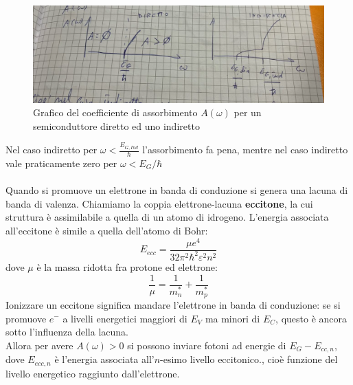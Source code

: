 \documentclass{book}
\begin{document}
        \begin{figure}[h!]
            \centering
            \includegraphics[width=0.75\linewidth]{img/imnothere7.png}
            \caption{Grafico del coefficiente di assorbimento $A(\omega)$ per un semiconduttore diretto ed uno indiretto}
        \end{figure}
        Nel caso indiretto per $\displaystyle \omega  < \frac{E_{G,Ind}}{\hbar}$ l'assorbimento fa pena, mentre nel caso indiretto vale praticamente zero per $\omega < E_{G}/\hbar$
    \paragraph{}
        Quando si promuove un elettrone in banda di conduzione si genera una lacuna di banda di valenza. Chiamiamo la coppia elettrone-lacuna \textbf{eccitone}, la cui struttura è assimilabile a quella di un atomo di idrogeno. L'energia associata all'eccitone è simile a quella dell'atomo di Bohr:
        $$E_{ecc} = \frac{\mu e^{4}}{32 \pi^{2} \hbar^{2} \varepsilon^{2} n^{2}}$$
        dove $\mu$ è la massa ridotta fra protone ed elettrone:
        $$\frac{1}{\mu} = \frac{1}{m_{n} ^{*}}+\frac{1}{m_{p} ^{*}}$$
        Ionizzare un eccitone significa mandare l'elettrone in banda di conduzione: se si promuove $e^{-}$ a livelli energetici maggiori di $E_{V}$ ma minori di $E_{C}$, questo è ancora sotto l'influenza della lacuna. \\
        Allora per avere $A(\omega) > 0$ si possono inviare fotoni ad energie di $E_{G} - E_{cc,n}$, dove $E_{ecc,n}$ è l'energia associata all'$n$-esimo livello eccitonico., cioè funzione del livello energetico raggiunto dall'elettrone.
\end{document}
